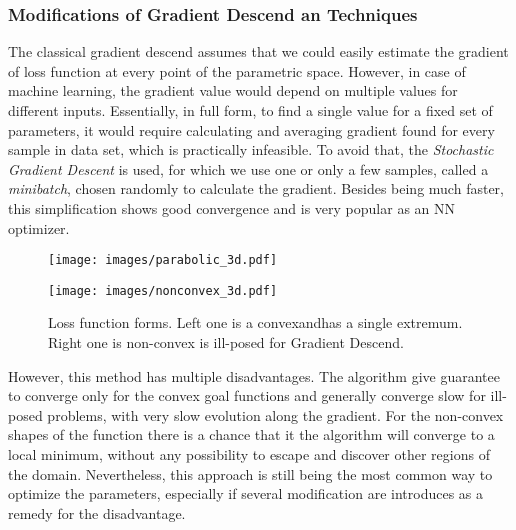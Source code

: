 \subsubsection{Modifications of Gradient Descend an Techniques}

The classical gradient descend assumes that we could easily estimate the gradient of loss function at every point of the parametric space.
However, in case of machine learning, the gradient value would depend on multiple values for different inputs.
Essentially, in full form, to find a single value for a fixed set of parameters, it would require calculating and averaging gradient found for every sample in data set, which is practically infeasible.
To avoid that, the \textit{Stochastic Gradient Descent} is used, for which we use one or only a few samples, called a \textit{minibatch}, chosen randomly to calculate the gradient.
Besides being much faster, this simplification shows good convergence and is very popular as an NN optimizer\cite{}.

\begin{figure*}
	\begin{multicols}{2}
		\texttt{[image: images/parabolic\_3d.pdf]}\par
		\texttt{[image: images/nonconvex\_3d.pdf]}\par
	\end{multicols}
	\caption{Loss function forms. Left one is a convexandhas a single extremum. Right one is non-convex is ill-posed for Gradient Descend. }
	\label{fig:lossfunc_demo}
\end{figure*}
	
However, this method has multiple disadvantages.
The algorithm give guarantee to converge only for the convex goal functions and generally converge slow for ill-posed problems, with very slow evolution along the gradient.
For the non-convex shapes of the function there is a chance that it the algorithm will converge to a local minimum, without any possibility to escape and discover other regions of the domain.
Nevertheless, this approach is still being the most common way to optimize the parameters, especially if several modification are introduces as a remedy for the disadvantage.
\medskip

